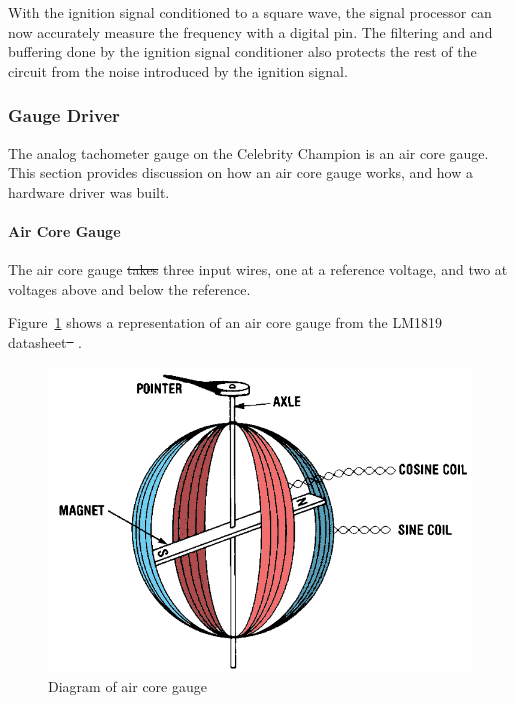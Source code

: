 \documentclass[11pt]{article}
\providecommand{\DIFaddtex}[1]{{\protect\color{blue}\uwave{#1}}} %
\providecommand{\DIFdeltex}[1]{{\protect\color{red}\sout{#1}}}                      %
\providecommand{\DIFaddbegin}{} %
\providecommand{\DIFaddend}{} %
\providecommand{\DIFdelbegin}{} %
\providecommand{\DIFdelend}{} %
\providecommand{\DIFaddFL}[1]{\DIFadd{#1}} %
\providecommand{\DIFaddbeginFL}{} %
\providecommand{\DIFaddendFL}{} %
\providecommand{\DIFdelbeginFL}{} %
\providecommand{\DIFdelendFL}{} %
\providecommand{\DIFadd}[1]{\texorpdfstring{\DIFaddtex{#1}}{#1}} %
\providecommand{\DIFdel}[1]{\texorpdfstring{\DIFdeltex{#1}}{}} %
\newcommand{\DIFscaledelfig}{0.5}
\newlength{\DIFdelgraphicswidth} %
\newlength{\DIFdelgraphicsheight} %
\newcommand{\DIFaddincludegraphics}[2][]{{\color{blue}\fbox{\DIFOincludegraphics[#1]{#2}}}} %
\newcommand{\DIFdelincludegraphics}[2][]{%
\sbox{\DIFdelgraphicsbox}{\DIFOincludegraphics[#1]{#2}}%
\settoboxwidth{\DIFdelgraphicswidth}{\DIFdelgraphicsbox} %
\settoboxtotalheight{\DIFdelgraphicsheight}{\DIFdelgraphicsbox} %
\scalebox{\DIFscaledelfig}{%
\parbox[b]{\DIFdelgraphicswidth}{\usebox{\DIFdelgraphicsbox}\\[-\baselineskip] \rule{\DIFdelgraphicswidth}{0em}}\llap{\resizebox{\DIFdelgraphicswidth}{\DIFdelgraphicsheight}{%
\setlength{\unitlength}{\DIFdelgraphicswidth}%
\begin{picture}(1,1)%
\thicklines\linethickness{2pt} %
{\color[rgb]{1,0,0}\put(0,0){\framebox(1,1){}}}%
{\color[rgb]{1,0,0}\put(0,0){\line( 1,1){1}}}%
{\color[rgb]{1,0,0}\put(0,1){\line(1,-1){1}}}%
\end{picture}%
}\hspace*{3pt}}} %
} %
\DeclareRobustCommand{\DIFaddbegin}{\DIFOaddbegin \let\includegraphics\DIFaddincludegraphics} %
\DeclareRobustCommand{\DIFaddend}{\DIFOaddend \let\includegraphics\DIFOincludegraphics} %
\DeclareRobustCommand{\DIFdelbegin}{\DIFOdelbegin \let\includegraphics\DIFdelincludegraphics} %
\DeclareRobustCommand{\DIFdelend}{\DIFOaddend \let\includegraphics\DIFOincludegraphics} %
\DeclareRobustCommand{\DIFaddbeginFL}{\DIFOaddbeginFL \let\includegraphics\DIFaddincludegraphics} %
\DeclareRobustCommand{\DIFaddendFL}{\DIFOaddendFL \let\includegraphics\DIFOincludegraphics} %
\DeclareRobustCommand{\DIFdelbeginFL}{\DIFOdelbeginFL \let\includegraphics\DIFdelincludegraphics} %
\DeclareRobustCommand{\DIFdelendFL}{\DIFOaddendFL \let\includegraphics\DIFOincludegraphics} %
\begin{document}
With the ignition signal conditioned to a square wave, the signal processor can now accurately measure the frequency with a digital pin. The filtering and and buffering done by the ignition signal conditioner also protects the rest of the circuit from the noise introduced by the ignition signal.

\subsubsection{Gauge Driver} %
\label{sec:gauge} %
The analog tachometer gauge on the Celebrity Champion is an air core gauge. This section provides discussion on how an air core gauge works, and how a hardware driver was built.
\paragraph{Air Core Gauge}
The air core gauge \DIFdelbegin \DIFdel{takes }\DIFdelend \DIFaddbegin \DIFadd{has }\DIFaddend three input wires, one at a reference voltage, and two at voltages above and below the reference.

Figure~\ref{fig:aircore} shows a representation of an air core gauge from the LM1819 datasheet\DIFdelbegin \DIFdel{\mbox{%
\cite{lm1819}}%
}\DIFdelend .


\begin{figure}[H]
    \centering
    \DIFdelbeginFL %
\DIFdelendFL \DIFaddbeginFL \includegraphics[width=.75\textwidth]{aircore}
    \DIFaddendFL \caption{Diagram of air core gauge\DIFaddbeginFL \DIFaddFL{~ \mbox{%
\cite{lm1819}}%
}\DIFaddendFL }
    \label{fig:aircore}
\end{figure}
\end{document}
